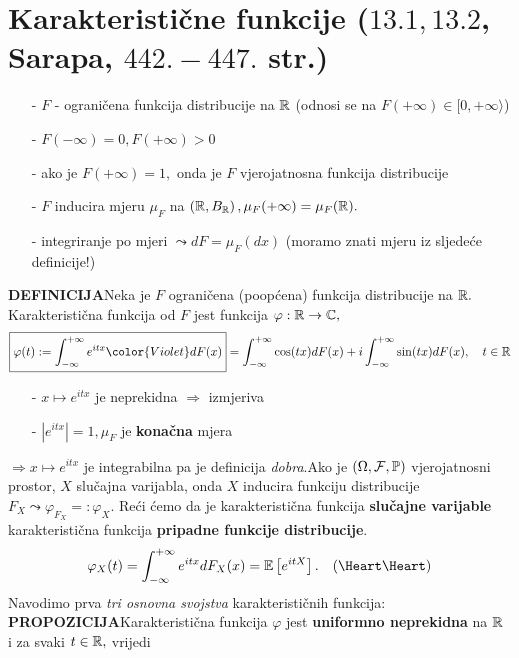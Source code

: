 \documentclass{article}
\begin{document}
\section{Karakteristične funkcije (\textsection \(13.1,13.2\), Sarapa, \(442.-447.\) str.)}
\begin{itemize}
    \item[-] \(F\) - ograničena funkcija distribucije na \(\Bbb R\) (odnosi se na \(F(+\infty)\in [0,+\infty\rangle\))
    \item[-] \(F(-\infty)=0,F(+\infty)>0\)
    \item[-] ako je \(F(+\infty)=1,\) onda je \(F\) vjerojatnosna funkcija distribucije
    \item[-] \(F\) inducira mjeru \(\mu_F\) na \(\left(\Bbb R,B_{\Bbb R}\right),\mu_F(+\infty)=\mu_F(\Bbb R).\) 
    \item[-] integriranje po mjeri \(\leadsto dF=\mu_F(dx)\) (moramo znati mjeru iz sljedeće definicije!)
\end{itemize}
\textbf{DEFINICIJA}\newline Neka je \(F\) ograničena (poopćena) funkcija distribucije na \(\Bbb R.\)  Karakteristična funkcija od \(F\) jest funkcija \(\varphi:\Bbb R\to\Bbb C,\) \[\boxed{\varphi(t):=\int_{-\infty}^{+\infty}e^{itx}{\color{Violet}dF(x)}}=\int_{-\infty}^{+\infty}\cos(tx)dF(x)+i\int_{-\infty}^{+\infty}\sin(tx)dF(x),\quad t\in\Bbb R\]
\begin{itemize}
    \item[-] \(x\mapsto e^{itx}\) je neprekidna \(\Rightarrow\) izmjeriva
    \item[-] \(|e^{itx}|=1,\mu_F\) je \textbf{konačna} mjera
\end{itemize}
\(\Rightarrow x\mapsto e^{itx}\) je integrabilna pa je definicija \emph{dobra}.\newline\newline Ako je \(\left(\Omega,\mathcal F,\Bbb P\right)\) vjerojatnosni prostor, \(X\) slučajna varijabla, onda \(X\) inducira funkciju distribucije \(F_X\leadsto\varphi_{F_X}=:\varphi_X.\) Reći ćemo da je karakteristična funkcija \textbf{slučajne varijable} karakteristična funkcija \textbf{pripadne funkcije distribucije}. \[\varphi_X(t)=\int_{-\infty}^{+\infty}e^{itx}dF_X(x)=\Bbb E\left[e^{itX}\right].\quad\text{(\Heart\Heart)}\]
Navodimo prva \emph{tri osnovna svojstva} karakterističnih funkcija:\newline
\textbf{PROPOZICIJA}\newline Karakteristična funkcija \(\varphi\) jest \textbf{uniformno neprekidna} na \(\Bbb R\) i za svaki \(t\in\Bbb R,\) vrijedi
\end{document}
